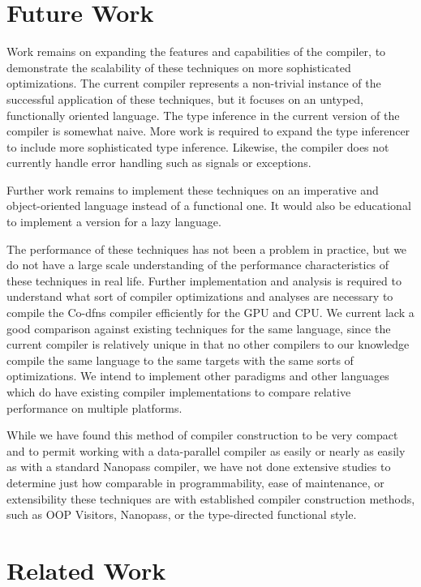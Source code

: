 \documentclass[numbers,preprint]{sigplanconf}
\begin{document}
\section{Future Work}

Work remains on expanding the features and capabilities of the compiler, 
to demonstrate the scalability of these techniques on more sophisticated 
optimizations. The current compiler represents a non-trivial instance of 
the successful application of these techniques, but it focuses on an untyped, 
functionally oriented language. The type inference in the current version 
of the compiler is somewhat naive. More work is required to expand the 
type inferencer to include more sophisticated type inference. Likewise, 
the compiler does not currently handle error handling such as signals or 
exceptions. 

Further work remains to implement these techniques on an imperative and 
object-oriented language instead of a functional one. It would also be 
educational to implement a version for a lazy language. 

The performance of these techniques has not been a problem in practice, but 
we do not have a large scale understanding of the performance characteristics 
of these techniques in real life. Further implementation and analysis is 
required to understand what sort of compiler optimizations and analyses are 
necessary to compile the Co-dfns compiler efficiently for the GPU and CPU. 
We current lack a good comparison against existing techniques for the same 
language, since the current compiler is relatively unique in that no other 
compilers to our knowledge compile the same language to the same targets 
with the same sorts of optimizations. We intend to implement other paradigms 
and other languages which do have existing compiler implementations to compare 
relative performance on multiple platforms. 

While we have found this method of compiler construction to be very compact 
and to permit working with a data-parallel compiler as easily or nearly as 
easily as with a standard Nanopass compiler, we have not done extensive 
studies to determine just how comparable in programmability, ease of 
maintenance, or extensibility these techniques are with established 
compiler construction methods, such as OOP Visitors, Nanopass, or the 
type-directed functional style.

\section{Related Work}
\end{document}
